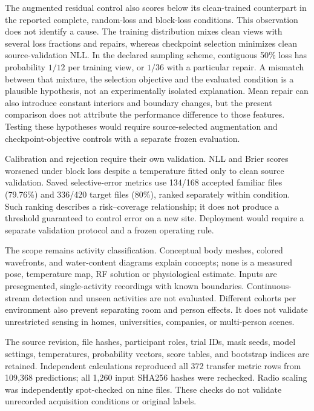 \documentclass[a4paper,11pt,fleqn]{mira-author}
\makeatletter
\renewcommand\section{\@startsection{section}{1}{0pt}{8pt plus 2pt minus 1pt}{4pt}{\normalfont\fontsize{11.5}{14}\selectfont\bfseries}}
\makeatother
\begin{document}
The augmented residual control also scores below its clean-trained counterpart in the reported complete, random-loss and block-loss conditions. This observation does not identify a cause. The training distribution mixes clean views with several loss fractions and repairs, whereas checkpoint selection minimizes clean source-validation NLL. In the declared sampling scheme, contiguous 50\% loss has probability $1/12$ per training view, or $1/36$ with a particular repair. A mismatch between that mixture, the selection objective and the evaluated condition is a plausible hypothesis, not an experimentally isolated explanation. Mean repair can also introduce constant interiors and boundary changes, but the present comparison does not attribute the performance difference to those features. Testing these hypotheses would require source-selected augmentation and checkpoint-objective controls with a separate frozen evaluation.

Calibration and rejection require their own validation. NLL and Brier scores worsened under block loss despite a temperature fitted only to clean source validation. Saved selective-error metrics use 134/168 accepted familiar files (79.76\%) and 336/420 target files (80\%), ranked separately within condition. Such ranking describes a risk--coverage relationship; it does not produce a threshold guaranteed to control error on a new site. Deployment would require a separate validation protocol and a frozen operating rule.

The scope remains activity classification. Conceptual body meshes, colored wavefronts, and water-content diagrams explain concepts; none is a measured pose, temperature map, RF solution or physiological estimate. Inputs are presegmented, single-activity recordings with known boundaries. Continuous-stream detection and unseen activities are not evaluated. Different cohorts per environment also prevent separating room and person effects. It does not validate unrestricted sensing in homes, universities, companies, or multi-person scenes.

\section{Reproducibility and conclusion}
The source revision, file hashes, participant roles, trial IDs, mask seeds, model settings, temperatures, probability vectors, score tables, and bootstrap indices are retained. Independent calculations reproduced all 372 transfer metric rows from 109,368 predictions; all 1,260 input SHA256 hashes were rechecked. Radio scaling was independently spot-checked on nine files. These checks do not validate unrecorded acquisition conditions or original labels.
\end{document}
